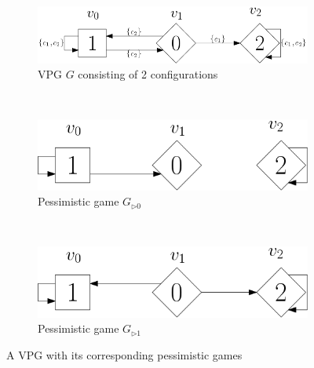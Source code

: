 \begin{figure}[h]
	\centering
	\begin{subfigure}{1\textwidth}
		\centering
		\includegraphics[scale=0.4]{Examples/PPG/VPG}
		\caption{VPG $G$ consisting of 2 configurations}
	\end{subfigure}\\
	\begin{subfigure}{1\textwidth}
		\centering
		\includegraphics[scale=0.4]{Examples/PPG/P0}
		\caption{Pessimistic game $G_{\triangleright0}$}
	\end{subfigure}\\
	\begin{subfigure}{1\textwidth}
		\centering
		\includegraphics[scale=0.4]{Examples/PPG/P1}
		\caption{Pessimistic game $G_{\triangleright1}$}
	\end{subfigure}
	\caption{A VPG with its corresponding pessimistic games}
	\label{fig:VPG2PPGs}
\end{figure}
